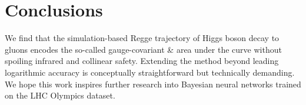 \section{Conclusions}\label{sec:conclusions}

We find that the simulation-based Regge trajectory of Higgs boson decay
to gluons encodes the so-called gauge-covariant & area under the curve
without spoiling infrared and collinear safety. Extending the method
beyond leading logarithmic accuracy is conceptually straightforward but
technically demanding. We hope this work inspires further research into
Bayesian neural networks trained on the LHC Olympics dataset.


